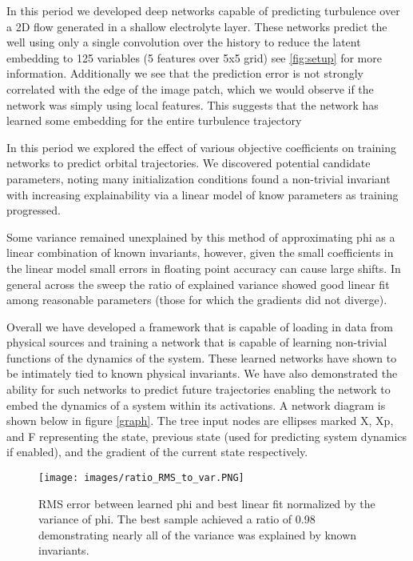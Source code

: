 \documentclass[10pt,letterpaper]{report}
\author{Brandon Houghton}
\begin{document}
In this period we developed deep networks capable of predicting turbulence over a 2D  flow generated in a shallow electrolyte layer. These networks predict the  well using only a single convolution over the history to reduce the latent embedding to 125 variables (5 features over 5x5 grid) see \ref{fig:setup} for more information. Additionally we see that the prediction error is not strongly correlated with the edge of the image patch, which we would observe if the network was simply using local features. This suggests that the network has learned some embedding for the entire turbulence trajectory





In this period we explored the effect of various objective coefficients on training networks to predict orbital trajectories. We discovered potential candidate parameters, noting many initialization conditions found a non-trivial invariant with increasing explainability via a linear model of know parameters as training progressed. 

Some variance remained unexplained by this method of approximating phi as a linear combination of known invariants, however, given the small coefficients in the linear model small errors in floating point accuracy can cause large shifts. In general across the sweep the ratio of explained variance showed good linear fit among reasonable parameters (those for which the gradients did not diverge). 

Overall we have developed a framework that is capable of loading in data from physical sources and training a network that is capable of learning non-trivial functions of the dynamics of the system. These learned networks have shown to be intimately tied to known physical invariants. We have also demonstrated the ability for such networks to predict future trajectories enabling the network to embed the dynamics of a system within its activations. A network diagram is shown below in figure \ref{graph}. The tree input nodes are ellipses marked X, Xp, and F representing the state, previous state (used for predicting system dynamics if enabled), and the gradient of the current state respectively.



\begin{figure}
	\begin{center}
		\texttt{[image: images/ratio\_RMS\_to\_var.PNG]}
		\caption{\small RMS error between learned phi and best linear fit normalized by the variance of phi. The best sample achieved a ratio of  0.98 demonstrating nearly all of the variance was explained by known invariants. }
		\label{setup}
	\end{center}	
\end{figure}
\end{document}
